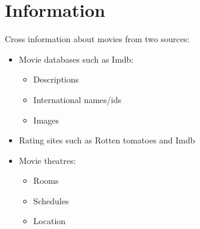 \documentclass[letterpaper]{article}
\begin{document}
\section*{Information}

Cross information about movies from two sources:
\begin{itemize}
   \item Movie databases such as Imdb:
   \begin{itemize}
   		\item Descriptions
   		\item International names/ids
   		\item Images
   \end{itemize}
   
   \item Rating sites such as Rotten tomatoes and Imdb
   
   \item Movie theatres:
   \begin{itemize}
   		\item Rooms
   		\item Schedules
   		\item Location
   \end{itemize}
\end{itemize}
\end{document}
